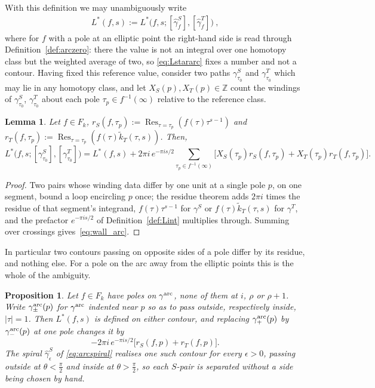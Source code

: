 \documentclass[11pt]{article}
\newtheorem{lemma}[theorem]{Lemma}
\newtheorem{proposition}[theorem]{Proposition}
\newcommand{\ZZ}{\mathbb{Z}}
\newcommand{\tk}{\widetilde{k}_T}
\DeclareMathOperator{\Res}{Res}
\begin{document}
With this definition we may unambiguously write
\begin{align}\label{eq:Lstararc}
L^*(f,s) := L^*\big(f, s; [\hat\gamma_f^S], [\hat\gamma_f^T]\big)~,
\end{align}
where for $f$ with a pole at an elliptic point the right-hand side is read through
Definition~\ref{def:arczero}: there the value is not an integral over one homotopy class but the
weighted average of two, so \eqref{eq:Lstararc} fixes a number and not a contour.
Having fixed this reference value, consider two paths $\gamma^S_{\tau_0}$ and
$\gamma^T_{\tau_0}$ which may lie in any homotopy class, and let $X_S(p),X_T(p)\in\ZZ$ count the
windings of $\gamma^S_{\tau_0}$, $\gamma^T_{\tau_0}$ about each pole $\tau_p\in f^{-1}(\infty)$
relative to the reference class.

\begin{lemma}\label{lem:wall_arc}
Let $f\in F_k$, $r_S(f, \tau_p) := \Res_{\tau=\tau_p} (f(\tau) \tau^{s-1})$
and $r_T(f, \tau_p) := \Res_{\tau=\tau_p} (f(\tau) \tk(\tau, s))$. Then,
\begin{equation}\label{eq:wall_arc}
L^*\big(f,s;[\gamma^S_{\tau_0}],[\gamma^T_{\tau_0}]\big)
= L^*(f,s)
+ 2\pi i\,e^{-\pi i s/2}\sum_{\tau_p\in f^{-1}(\infty)}\Big[
X_S(\tau_p) r_S(f, \tau_p)
+ X_T(\tau_p) r_T(f, \tau_p) \Big].
\end{equation}
\end{lemma}

\begin{proof}
Two pairs whose winding data differ by one unit at a single pole $p$, on one segment, bound a loop
encircling $p$ once; the residue theorem adds $2\pi i$ times the residue of that segment's
integrand, $f(\tau)\tau^{s-1}$ for $\gamma^S$ or $f(\tau)\tk(\tau,s)$ for $\gamma^T$, and the
prefactor $e^{-\pi i s/2}$ of Definition~\ref{def:Lint} multiplies through. Summing over crossings
gives~\eqref{eq:wall_arc}.
\end{proof}

In particular two contours passing on opposite sides of a pole differ by its residue, and nothing
else. For a pole on the arc away from the elliptic points this is the whole of the ambiguity.

\begin{proposition}\label{prop:arcside}
Let $f\in F_k$ have poles on $\gamma^{\rm arc}$, none of them at $i$, $\rho$ or $\rho+1$. Write
$\gamma^{\rm arc}_{\pm}(p)$ for $\gamma^{\rm arc}$ indented near $p$ so as to pass outside,
respectively inside, $|\tau|=1$. Then $L^*(f,s)$ is defined on either contour, and replacing
$\gamma^{\rm arc}_{+}(p)$ by $\gamma^{\rm arc}_{-}(p)$ at one pole changes it by
\begin{equation}\label{eq:sidediff}
-2\pi i\,e^{-\pi is/2}\big[r_S(f,p)+r_T(f,p)\big].
\end{equation}
The spiral $\hat\gamma^S_\epsilon$ of \eqref{eq:arcspiral} realises one such contour for every
$\epsilon>0$, passing outside at $\theta<\tfrac{\pi}{2}$ and inside at $\theta>\tfrac{\pi}{2}$, so
each $S$-pair is separated without a side being chosen by hand.
\end{proposition}
\end{document}
